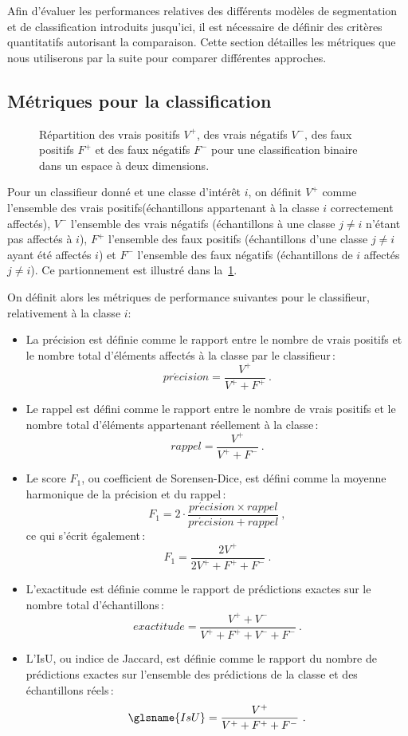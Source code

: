 Afin d'évaluer les performances relatives des différents modèles de segmentation et de classification introduits jusqu'ici, il est nécessaire de définir des critères quantitatifs autorisant la comparaison. Cette section détailles les métriques que nous utiliserons par la suite pour comparer différentes approches.

\subsection{Métriques pour la classification}

\def\tp{V^+}
\def\tn{V^-}
\def\fp{F^+}
\def\fn{F^-}
\def\precision{\mathit{pr\acute{e}cision}}
\def\recall{\mathit{rappel}}

\begin{figure}
	\resizebox{\textwidth}{!}{%
	
	}
	\caption{Répartition des vrais positifs $\tp$, des vrais négatifs $\tn$, des faux positifs $\fp$ et des faux négatifs $\fn$ pour une classification binaire dans un espace à deux dimensions.}
	\label{fig:classification_binaire}
\end{figure}

Pour un classifieur donné et une classe d'intérêt $i$, on définit $\tp$ comme l'ensemble des vrais positifs(échantillons appartenant à la classe $i$ correctement affectés), $\tn$ l'ensemble des vrais négatifs (échantillons à une classe $j \neq i$ n'étant pas affectés à $i$), $\fp$ l'ensemble des faux positifs (échantillons d'une classe $j \neq i$ ayant été affectés $i$) et $\fn$ l'ensemble des faux négatifs (échantillons de $i$ affectés $j \neq i$). Ce partionnement est illustré dans la~\cref{fig:classification_binaire}.

On définit alors les métriques de performance suivantes pour le classifieur, relativement à la classe $i$:
\begin{itemize}
	\item La précision est définie comme le rapport entre le nombre de vrais positifs et le nombre total d'éléments affectés à la classe par le classifieur\,:
  $$\precision = \frac{\tp}{\tp + \fp}~.$$
	\item Le rappel est défini comme le rapport entre le nombre de vrais positifs et le nombre total d'éléments appartenant réellement à la classe\,:
  $$\recall = \frac{\tp}{\tp + \fn}~.$$
	\item Le score $F_1$, ou coefficient de Sorensen-Dice, est défini comme la moyenne harmonique de la précision et du rappel\,:
  $$F_1 = 2\cdot\frac{\precision \times \recall}{\precision + \recall}~,$$
  ce qui s'écrit également\,:
  $$F_1 = \frac{2 \tp}{2 \tp + \fp + \fn}~.$$
	\item L'exactitude est définie comme le rapport de prédictions exactes sur le nombre total d'échantillons\,:
  $$\mathit{exactitude} = \frac{\tp + \tn}{\tp + \fp + \tn + \fn}~.$$
	\item L'\gls{IsU}, ou indice de Jaccard, est définie comme le rapport du nombre de prédictions exactes sur l'ensemble des prédictions de la classe et des échantillons réels\,:
  $$\glsname{IsU} = \frac{\tp}{\tp + \fp + \fn}~.$$
\end{itemize}


